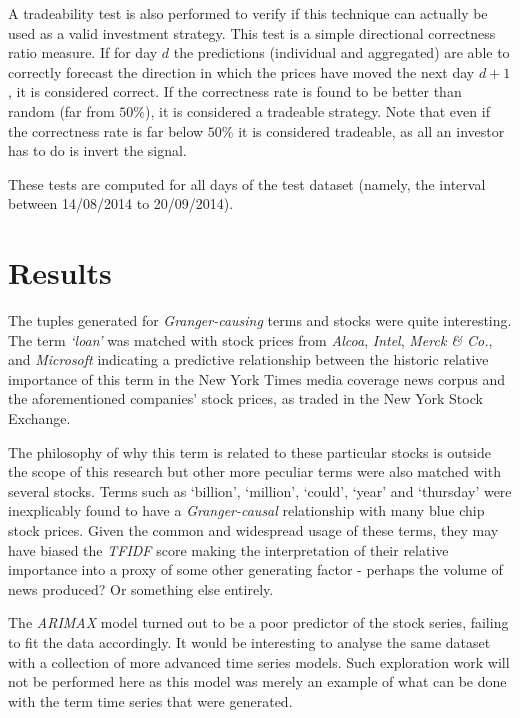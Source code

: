 \documentclass[conference,11pt]{IEEEtran}
\begin{document}
\par
A tradeability test is also performed to verify if this technique can actually be used as a valid investment strategy. This test is a simple directional correctness ratio measure. If for day \(d\) the predictions (individual and aggregated) are able to correctly forecast the direction in which the prices have moved the next day \(d+1\), it is considered correct. If the correctness rate is found to be better than random (far from \(50\%\)), it is considered a tradeable strategy. Note that even if the correctness rate is far below \(50\%\) it is considered tradeable, as all an investor has to do is invert the signal.

\par
These tests are computed for all days of the test dataset (namely, the interval between 14/08/2014 to 20/09/2014).

\section{Results}
The tuples generated for \textit{Granger-causing} terms and stocks were quite interesting. The term \textit{`loan'} was matched with stock prices from \textit{Alcoa}, \textit{Intel}, \textit{Merck \& Co.}, and \textit{Microsoft} indicating a predictive relationship between the historic relative importance of this term in the New York Times media coverage news corpus and the aforementioned companies' stock prices, as traded in the New York Stock Exchange.

\par
The philosophy of why this term is related to these particular stocks is outside the scope of this research but other more peculiar terms were also matched with several stocks. Terms such as `billion', `million', `could', `year' and `thursday'  were inexplicably found to have a \textit{Granger-causal} relationship with many blue chip stock prices. Given the common and widespread usage of these terms, they may have biased the \textit{TFIDF} score making the interpretation of their relative importance into a proxy of some other generating factor - perhaps the volume of news produced? Or something else entirely.

\par
The \textit{ARIMAX} model turned out to be a poor predictor of the stock series, failing to fit the data accordingly. It would be interesting to analyse the same dataset with a collection of more advanced time series models. Such exploration work will not be performed here as this model was merely an example of what can be done with the term time series that were generated.
\end{document}
